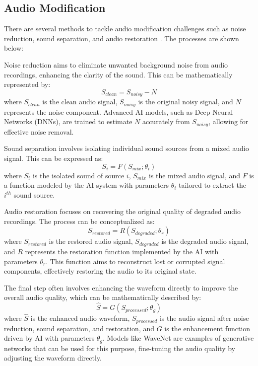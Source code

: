 \documentclass[11pt,a4paper,oneside]{report}
\begin{document}
\subsection{Audio Modification}

There are several methods to tackle audio modification challenges such as noise reduction, sound separation, and audio restoration \cite{godsill2002digital}. 
The processes are shown below:

Noise reduction aims to eliminate unwanted background noise from audio recordings, enhancing the clarity of the sound. This can be mathematically represented by:
\begin{equation}
S_{clean} = S_{noisy} - N
\end{equation}
where $S_{clean}$ is the clean audio signal, $S_{noisy}$ is the original noisy signal, and $N$ represents the noise component. Advanced AI models, such as Deep Neural Networks (DNNs), are trained to estimate $N$ accurately from $S_{noisy}$, allowing for effective noise removal.

Sound separation involves isolating individual sound sources from a mixed audio signal. This can be expressed as:
\begin{equation}
S_i = F(S_{mix}; \theta_i)
\end{equation}
where $S_i$ is the isolated sound of source $i$, $S_{mix}$ is the mixed audio signal, and $F$ is a function modeled by the AI system with parameters $\theta_i$ tailored to extract the $i^{th}$ sound source.

Audio restoration focuses on recovering the original quality of degraded audio recordings. The process can be conceptualized as:
\begin{equation}
S_{restored} = R(S_{degraded}; \theta_r)
\end{equation}
where $S_{restored}$ is the restored audio signal, $S_{degraded}$ is the degraded audio signal, and $R$ represents the restoration function implemented by the AI with parameters $\theta_r$. This function aims to reconstruct lost or corrupted signal components, effectively restoring the audio to its original state.

The final step often involves enhancing the waveform directly to improve the overall audio quality, which can be mathematically described by:
\begin{equation}
\hat{S} = G(S_{processed}; \theta_g)
\end{equation}
where $\hat{S}$ is the enhanced audio waveform, $S_{processed}$ is the audio signal after noise reduction, sound separation, and restoration, and $G$ is the enhancement function driven by AI with parameters $\theta_g$. Models like WaveNet are examples of generative networks that can be used for this purpose, fine-tuning the audio quality by adjusting the waveform directly.
\end{document}
